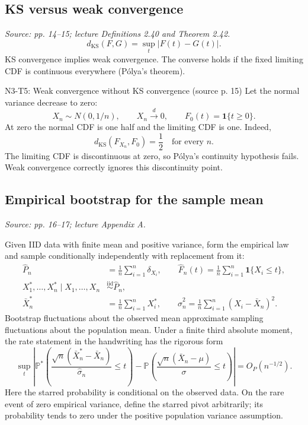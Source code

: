 \documentclass[12pt]{article}
\newcommand{\Prob}{\mathbb P}
\newcommand{\ind}{\mathbf 1}
\begin{document}
\subsection{KS versus weak convergence}\label{sec:ks-source}
\textit{Source: pp. 14--15; lecture Definitions 2.40 and Theorem 2.42.}
\begin{equation}
 d_{\mathrm{KS}}(F,G)=\sup_t|F(t)-G(t)|.
\end{equation}
KS convergence implies weak convergence. The converse holds if the fixed
limiting CDF is continuous everywhere (P\'olya's theorem).
\begin{todobox}{N3-T5: Weak convergence without KS convergence (source p. 15)}
Let the normal variance decrease to zero:
\begin{equation}
 X_n\sim N(0,1/n),\qquad X_n\xrightarrow{d}0,
 \qquad F_0(t)=\ind\{t\ge0\}.
\end{equation}
At zero the normal CDF is one half and the limiting CDF is one. Indeed,
\begin{equation}
 d_{\mathrm{KS}}(F_{X_n},F_0)=\frac12\quad\text{for every }n.
\end{equation}
The limiting CDF is discontinuous at zero, so P\'olya's continuity hypothesis
fails. Weak convergence correctly ignores this discontinuity point.
\end{todobox}

\subsection{Empirical bootstrap for the sample mean}
\textit{Source: pp. 16--17; lecture Appendix A.}

Given IID data with finite mean and positive variance, form the empirical law
and sample conditionally independently with replacement from it:
\begin{align}
 \widehat P_n&=\frac1n\sum_{i=1}^n\delta_{X_i},\qquad
 \widehat F_n(t)=\frac1n\sum_{i=1}^n\ind\{X_i\le t\},\\
 X_1^*,\ldots,X_n^*\mid X_1,\ldots,X_n
 &\overset{\mathrm{iid}}\sim\widehat P_n,\\
 \bar X_n^*&=\frac1n\sum_{i=1}^nX_i^*,\qquad
 \widehat\sigma_n^2=\frac1n\sum_{i=1}^n(X_i-\bar X_n)^2.
\end{align}
Bootstrap fluctuations about the observed mean approximate sampling
fluctuations about the population mean. Under a finite third absolute
moment, the rate statement in the handwriting has the rigorous form
\begin{equation}\label{eq:bootstrap}
 \sup_t\left|
 \Prob^*\!\left(\frac{\sqrt n(\bar X_n^*-\bar X_n)}{\widehat\sigma_n}\le t\right)
 -\Prob\!\left(\frac{\sqrt n(\bar X_n-\mu)}{\sigma}\le t\right)
 \right|=O_P(n^{-1/2}).
\end{equation}
Here the starred probability is conditional on the observed data. On the
rare event of zero empirical variance, define the starred pivot arbitrarily;
its probability tends to zero under the positive population variance assumption.
\end{document}

